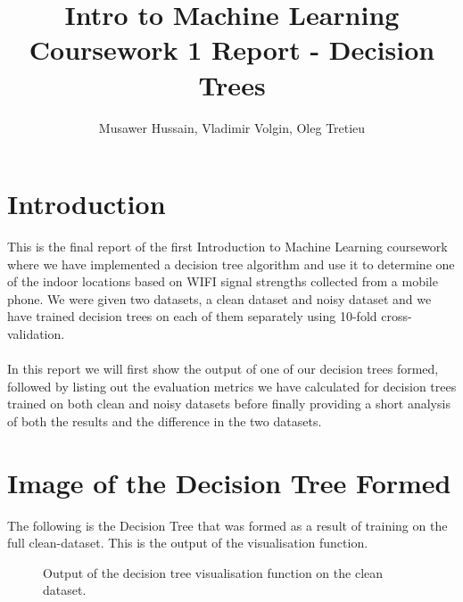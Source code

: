 \documentclass[a4paper, 11pt]{article}
\begin{document}
\title{Intro to Machine Learning Coursework 1 Report - Decision Trees}

\author{Musawer Hussain, Vladimir Volgin, Oleg Tretieu}

\maketitle

\section{Introduction}
This is the final report of the first Introduction to Machine Learning coursework where we have implemented a decision tree algorithm and use it to determine one of the indoor locations based on WIFI signal strengths collected from a mobile phone. We were given two datasets, a clean dataset and noisy dataset and we have trained decision trees on each of them separately using 10-fold cross-validation.
\\ \\
In this report we will first show the output of one of our decision trees formed, followed by listing out the evaluation metrics we have calculated for decision trees trained on both clean and noisy datasets before finally providing a short analysis of both the results and the difference in the two datasets.

\section{Image of the Decision Tree Formed}

The following is the Decision Tree that was formed as a result of training on the full clean-dataset. This is the output of the visualisation function.

\begin{figure}[h]
  \centering
  \caption{Output of the decision tree visualisation function on the clean dataset.}
\end{figure}
\end{document}
